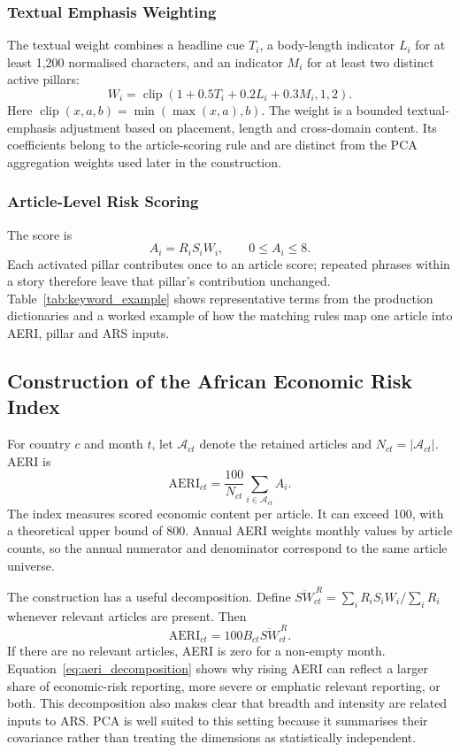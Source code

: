 \documentclass[12pt]{article}
\newcommand{\clip}{\operatorname{clip}}
\begin{document}
\subsubsection{Textual Emphasis Weighting}\label{sec:confidence_weighting}
The textual weight combines a headline cue $T_i$, a body-length indicator $L_i$ for at least 1,200 normalised characters, and an indicator $M_i$ for at least two distinct active pillars:
\begin{equation}W_i=\clip(1+0.5T_i+0.2L_i+0.3M_i,1,2).\label{eq:confidence}\end{equation}
Here $\clip(x,a,b)=\min(\max(x,a),b)$. The weight is a bounded textual-emphasis adjustment based on placement, length and cross-domain content. Its coefficients belong to the article-scoring rule and are distinct from the PCA aggregation weights used later in the construction.
\subsubsection{Article-Level Risk Scoring}\label{sec:article_scoring}
The score is
\begin{equation} A_i=R_iS_iW_i,\qquad 0\leq A_i\leq8.\label{eq:article}\end{equation}
Each activated pillar contributes once to an article score; repeated phrases within a story therefore leave that pillar's contribution unchanged. Table~\ref{tab:keyword_example} shows representative terms from the production dictionaries and a worked example of how the matching rules map one article into AERI, pillar and ARS inputs.

\subsection{Construction of the African Economic Risk Index}\label{sec:aeri}
For country $c$ and month $t$, let $\mathcal A_{ct}$ denote the retained articles and $N_{ct}=|\mathcal A_{ct}|$. AERI is
\begin{equation}\mathrm{AERI}_{ct}=\frac{100}{N_{ct}}\sum_{i\in\mathcal A_{ct}}A_i.\label{eq:aeri}\end{equation}
The index measures scored economic content per article. It can exceed 100, with a theoretical upper bound of 800. Annual AERI weights monthly values by article counts, so the annual numerator and denominator correspond to the same article universe.

The construction has a useful decomposition. Define $\overline{SW}_{ct}^{\,R}=\sum_iR_iS_iW_i/\sum_iR_i$ whenever relevant articles are present. Then
\begin{equation}
 \mathrm{AERI}_{ct}=100B_{ct}\overline{SW}_{ct}^{\,R}.\label{eq:aeri_decomposition}
\end{equation}
If there are no relevant articles, AERI is zero for a non-empty month. Equation~\eqref{eq:aeri_decomposition} shows why rising AERI can reflect a larger share of economic-risk reporting, more severe or emphatic relevant reporting, or both. This decomposition also makes clear that breadth and intensity are related inputs to ARS. PCA is well suited to this setting because it summarises their covariance rather than treating the dimensions as statistically independent.
\end{document}
